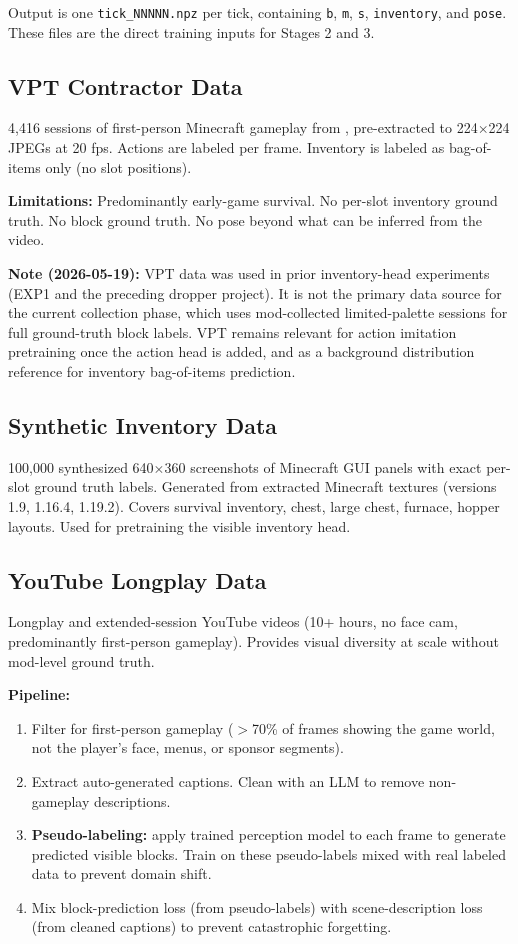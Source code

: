 \documentclass[11pt,a4paper]{article}
\begin{document}
Output is one \texttt{tick\_NNNNN.npz} per tick, containing \texttt{b}, \texttt{m}, \texttt{s}, \texttt{inventory}, and \texttt{pose}. These files are the direct training inputs for Stages 2 and 3.

\subsection{VPT Contractor Data}

4{,}416 sessions of first-person Minecraft gameplay from \citet{vpt}, pre-extracted to 224$\times$224 JPEGs at 20 fps. Actions are labeled per frame. Inventory is labeled as bag-of-items only (no slot positions).

\textbf{Limitations:} Predominantly early-game survival. No per-slot inventory ground truth. No block ground truth. No pose beyond what can be inferred from the video.

\textbf{Note (2026-05-19):} VPT data was used in prior inventory-head experiments (EXP1 and the preceding dropper project). It is not the primary data source for the current collection phase, which uses mod-collected limited-palette sessions for full ground-truth block labels. VPT remains relevant for action imitation pretraining once the action head is added, and as a background distribution reference for inventory bag-of-items prediction.

\subsection{Synthetic Inventory Data}

100{,}000 synthesized 640$\times$360 screenshots of Minecraft GUI panels with exact per-slot ground truth labels. Generated from extracted Minecraft textures (versions 1.9, 1.16.4, 1.19.2). Covers survival inventory, chest, large chest, furnace, hopper layouts. Used for pretraining the visible inventory head.

\subsection{YouTube Longplay Data}

Longplay and extended-session YouTube videos (10+ hours, no face cam, predominantly first-person gameplay). Provides visual diversity at scale without mod-level ground truth.

\textbf{Pipeline:}
\begin{enumerate}
  \item Filter for first-person gameplay ($>$70\% of frames showing the game world, not the player's face, menus, or sponsor segments).
  \item Extract auto-generated captions. Clean with an LLM to remove non-gameplay descriptions.
  \item \textbf{Pseudo-labeling:} apply trained perception model to each frame to generate predicted visible blocks. Train on these pseudo-labels mixed with real labeled data to prevent domain shift.
  \item Mix block-prediction loss (from pseudo-labels) with scene-description loss (from cleaned captions) to prevent catastrophic forgetting.
\end{enumerate}
\end{document}
